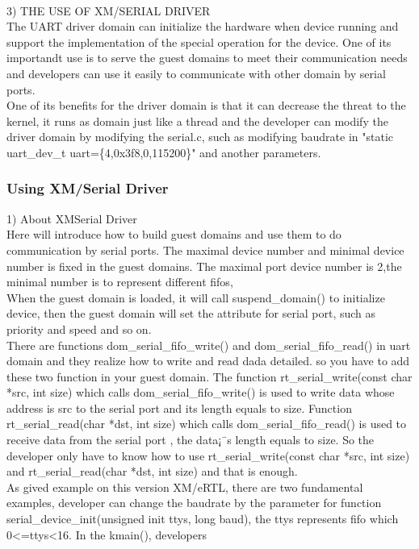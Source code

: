 \\
3)  THE USE OF XM/SERIAL DRIVER 
\\
The UART driver domain can initialize the hardware when device running and support the implementation of the special operation for the device. One of its importandt use is to serve the guest domains to meet their communication needs and developers can use it easily to communicate with other domain by serial ports.
\\
	One of its benefits for the driver domain is that it can decrease the threat to the kernel, it runs as domain just like a thread and
 the developer can modify the driver domain by modifying the serial.c, such as modifying baudrate in 
"static uart\_dev\_t uart=\{4,0x3f8,0,115200\}" and another parameters.

\subsubsection{Using XM/Serial Driver}
1) About XM\/Serial Driver
\\
Here will introduce how to build guest domains and use them to do communication by serial ports. The maximal device number and minimal device number is fixed in the guest domains. The maximal port device number is 2,the minimal number is to represent different fifos,
\\
When the guest domain is loaded, it will call suspend\_domain() to initialize device, then the guest domain will set the attribute for serial port, such as priority and speed and so on.
\\
There are functions dom\_serial\_fifo\_write() and dom\_serial\_fifo\_read() in uart domain and they realize how to write and read dada detailed. so you have to add these two function in your guest domain. The function rt\_serial\_write(const char *src, int size) which calls dom\_serial\_fifo\_write() is used to write data whose address is src to the serial port and its length equals to size. Function rt\_serial\_read(char *dst, int size) which calls dom\_serial\_fifo\_read() is used to receive data from the serial port , the data¡¯s length equals to size. So the developer only have to know how to use rt\_serial\_write(const char *src, int size) and rt\_serial\_read(char *dst, int size) and that is enough. 
\\
	As gived example on this version XM/eRTL, there are two fundamental examples, developer can change the baudrate by the parameter
 for function serial\_device\_init(unsigned init ttys, long  baud), the ttys represents fifo which 0<=ttys<16. In the kmain(), developers 
